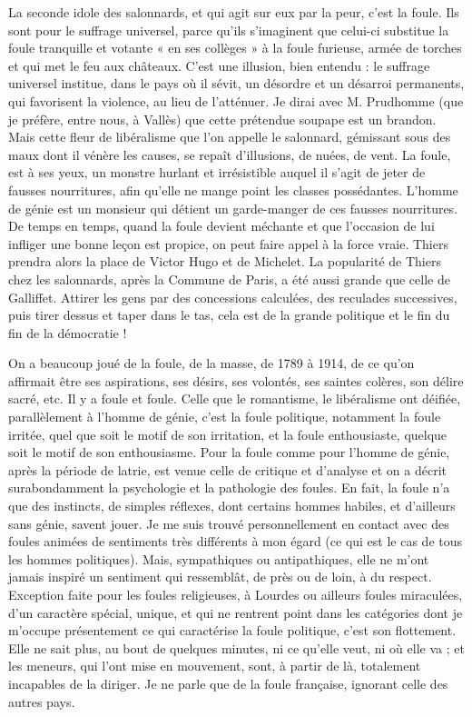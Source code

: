 \documentclass[french,twoside]{book} %
\begin{document}
La seconde idole des salonnards, et qui agit sur eux par la peur, c’est la foule. Ils sont pour le suffrage universel, parce qu’ils s’imaginent que celui-ci substitue la foule tranquille et votante « en ses collèges » à la foule furieuse, armée de torches et qui met le feu aux châteaux. C’est une illusion, bien entendu : le suffrage universel institue, dans le pays où il sévit, un désordre et un désarroi permanents, qui favorisent la violence, au lieu de l’atténuer. Je dirai avec M. Prudhomme (que je préfère, entre nous, à Vallès) que cette prétendue soupape est un brandon. Mais cette fleur de libéralisme que l’on appelle le salonnard, gémissant sous des maux dont il vénère les causes, se repaît d’illusions, de nuées, de vent. La foule, est à ses yeux, un monstre hurlant et irrésistible auquel il s’agit de jeter de fausses nourritures, afin qu’elle ne mange point les classes possédantes. L’homme de génie est un monsieur qui détient un garde-manger de ces fausses nourritures. De temps en temps, quand la foule devient méchante et que l’occasion de lui infliger une bonne leçon est propice, on peut faire appel à la force vraie. Thiers prendra alors la place de Victor Hugo et de Michelet. La popularité de Thiers chez les salonnards, après la Commune de Paris, a été aussi grande que celle de Galliffet. Attirer les gens par des concessions calculées, des reculades successives, puis tirer dessus et taper dans le tas, cela est de la grande politique et le fin du fin de la démocratie !\par
On a beaucoup joué de la foule, de la masse, de 1789 à 1914, de ce qu’on affirmait être ses aspirations, ses désirs, ses volontés, ses saintes colères, son délire sacré, etc. Il y a foule et foule. Celle que le romantisme, le libéralisme ont déifiée, parallèlement à l’homme de génie, c’est la foule politique, notamment la foule irritée, quel que soit le motif de son irritation, et la foule enthousiaste, quelque soit le motif de son enthousiasme. Pour la foule comme pour l’homme de génie, après la période de latrie, est venue celle de critique et d’analyse et on a décrit surabondamment la psychologie et la pathologie des foules. En fait, la foule n’a que des instincts, de simples réflexes, dont certains hommes habiles, et d’ailleurs sans génie, savent jouer. Je me suis trouvé personnellement en contact avec des foules animées de sentiments très différents à mon égard (ce qui est le cas de tous les hommes politiques). Mais, sympathiques ou antipathiques, elle ne m’ont jamais inspiré un sentiment qui ressemblât, de près ou de loin, à du respect. Exception faite pour les foules religieuses, à Lourdes ou ailleurs foules miraculées, d’un caractère spécial, unique, et qui ne rentrent point dans les catégories dont je m’occupe présentement ce qui caractérise la foule politique, c’est son flottement. Elle ne sait plus, au bout de quelques minutes, ni ce qu’elle veut, ni où elle va ; et les meneurs, qui l’ont mise en mouvement, sont, à partir de là, totalement incapables de la diriger. Je ne parle que de la foule française, ignorant celle des autres pays.\par
\end{document}
